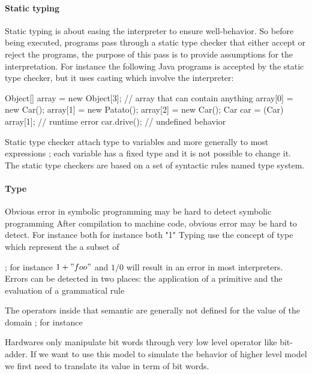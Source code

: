 \documentclass[a4paper]{report}
\begin{document}
\paragraph{Static typing} Static typing is about easing the interpreter to ensure well-behavior. So before being executed, programs pass through a static type checker that either accept or reject the programs, the purpose of this pass is to provide assumptions for the interpretation. For instance the following Java programs is accepted by the static type checker, but it uses casting which involve the interpreter:
\begin{java}
Object[] array = new Object[3]; // array that can contain anything
array[0] = new Car();
array[1] = new Patato();
array[2] = new Car();
Car car = (Car) array[1];       // runtime error
car.drive();                    // undefined behavior
\end{java}
Static type checker attach type to variables and more generally to most expressions ; each variable has a fixed type and it is not possible to change it. The static type checkers are based on a set of syntactic rules named type system.



\paragraph{Type}  

Obvious error in symbolic programming may be hard to detect  symbolic programming  After compilation to machine code, obvious error may be hard to detect. For instance both  for instance both "1" Typing use the concept of type which represent the a subset of 


 ; for instance $1+"foo"$ and $1/0$ will result in an error in most interpreters. Errors can be detected in two places: the application of a primitive and the evaluation of a grammatical rule

The operators inside that semantic are generally not defined for the value of the domain ; for instance 



Hardwares only manipulate bit words through very low level operator like bit-adder. If we want to use this model to simulate the behavior of higher level model we first need to translate its value in term of bit words.
\end{document}
